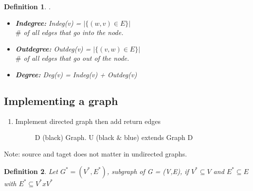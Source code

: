 \documentclass[10pt,a4paper]{article}
\newtheorem {defi}{Definition}[section]
\begin{document}
\newpage
\begin{defi}
    . 
	\begin{itemize}
		\item \textbf{Indegree:} Indeg(v) = $|\{(w,v) \in E\}|$ \\
		$\#$ of all edges that go into the node. 
		\item \textbf{Outdegree:} Outdeg(v) = $|\{(v,w) \in E\}|$ \\
		$\#$ of all edges that go out of the node.
		\item \textbf{Degree: } Deg(v) = Indeg(v) + Outdeg(v)
	\end{itemize}
\end{defi}

\subsection{Implementing a graph}
\begin{enumerate}
	\item Implement directed graph then add return edges
	\begin{figure}[h!]
		\centering
		\caption{D (black) Graph. U (black $\&$ blue) extends Graph D}
	\end{figure}
\end{enumerate}
Note: source and taget does not matter in undirected graphs. 
\begin{defi}
	Let $G^{*} = (V^{*},E^{*})$, subgraph of G = (V,E), if $V^{*} \subseteq V$ and $E^{*} \subseteq E $ with $E^{*} \subseteq V^{*}xV^{*}$
\end{defi}
\end{document}

